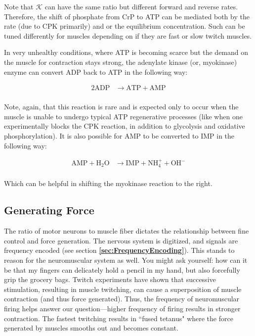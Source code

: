 Note that $\mathcal{K}$ can have the same ratio but different forward and reverse rates. Therefore, the shift of phosphate from CrP to ATP can be mediated both by the rate (due to CPK primarily) and or the equilibrium concentration. Such can be tuned differently for muscles depending on if they are fast or slow twitch muscles.\newline

In very unhealthy conditions, where ATP is becoming scarce but the demand on the muscle for contraction stays strong, the adenylate kinase (or, myokinase) enzyme can convert ADP back to ATP in the following way: 

\begin{equation}
\begin{split}
    2\mathrm{ADP} &\rightarrow \mathrm{ATP} + \mathrm{AMP} \\
\end{split}
\end{equation}

Note, again, that this reaction is rare and is expected only to occur when the muscle is unable to undergo typical ATP regenerative processes (like when one experimentally blocks the CPK reaction, in addition to glycolysis and oxidative phosphorylation). It is also possible for AMP to be converted to IMP in the following way: 

\begin{equation}
\begin{split}
    \mathrm{AMP} + \mathrm{H}_2\mathrm{O} &\rightarrow \mathrm{IMP} + \mathrm{NH}_4^+ + \mathrm{OH}^- \\
\end{split}
\end{equation}

Which can be helpful in shifting the myokinase reaction to the right. 


\subsection{Generating Force}

The ratio of motor neurons to muscle fiber dictates the relationship between fine control and force generation. The nervous system is digitized, and signals are frequency encoded (see section \textbf{\ref{sec:FrequencyEncoding}}). This stands to reason for the neuromuscular system as well. You might ask yourself: how can it be that my fingers can delicately hold a pencil in my hand, but also forcefully grip the grocery bags. Twitch experiments have shown that successive stimulation, resulting in muscle twitching, can cause a superposition of muscle contraction (and thus force generated). Thus, the frequency of neuromuscular firing helps answer our question---higher frequency of firing results in stronger contraction. The fastest twitching results in ``fused tetanus" where the force generated by muscles smooths out and becomes constant.\newline


